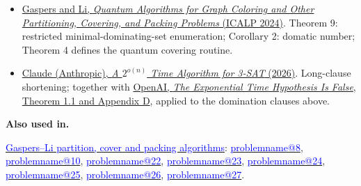 \documentclass[11pt,a4paper]{article}
\makeatletter
\theoremstyle{problemstyle}
\newenvironment{algorithmindex}[1]{%
  \begin{itemize}[label=\textbullet,leftmargin=1.3em,labelsep=0.6em,itemsep=4pt,topsep=3pt,parsep=0pt]
  \small
}{\end{itemize}}
\newcommand{\problemref}[1]{\hyperref[entry:#1]{\textcolor{blue}{\csname problemname@#1\endcsname}}}
\newcommand{\algorithmref}[2]{\hyperref[algorithm:#1]{\textcolor{blue}{#2}}}
\makeatother
\begin{document}
\begin{algorithmindex}{21}
\item \href{https://arxiv.org/pdf/2311.08042}{Gaspers and Li, \emph{Quantum Algorithms for Graph Coloring and Other Partitioning, Covering, and Packing Problems} (ICALP 2024)}. Theorem 9: restricted minimal-dominating-set enumeration; Corollary 2: domatic number; Theorem 4 defines the quantum covering routine.
\item \href{https://github.com/anthropics/formal-math/tree/main/eth}{Claude (Anthropic), \emph{A $2^{o(n)}$ Time Algorithm for 3-SAT} (2026)}. Long-clause shortening; together with \href{https://github.com/openai/math/blob/main/preprints/The-Exponential-Time-Hypothesis-is-False-October-25-2026/paper.pdf}{OpenAI, \emph{The Exponential Time Hypothesis Is False}, Theorem 1.1 and Appendix D}, applied to the domination clauses above.
\end{algorithmindex}
\par{}\begingroup\small
\textbf{Also used in.}
\par\algorithmref{gaspers-li}{Gaspers--Li partition, cover and packing algorithms}: \problemref{8}, \problemref{10}, \problemref{22}, \problemref{23}, \problemref{24}, \problemref{25}, \problemref{26}, \problemref{27}.
\par\endgroup
\end{document}

